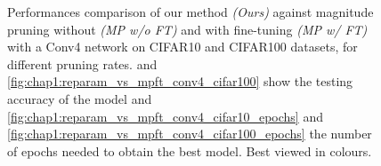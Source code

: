 \begin{figure}
  \caption{ Performances comparison of our method {\em(Ours)} against
  magnitude pruning without {\em(MP w/o FT)} and with fine-tuning {\em(MP w/ FT)} with a Conv4 network on
  CIFAR10 and CIFAR100 datasets, for different pruning rates.
   and
  \cref{fig:chap1:reparam_vs_mpft_conv4_cifar100} show the testing accuracy of
  the model and \cref{fig:chap1:reparam_vs_mpft_conv4_cifar10_epochs} and
  \cref{fig:chap1:reparam_vs_mpft_conv4_cifar100_epochs} the number of epochs
  needed to obtain the best model. Best viewed in colours.}
  \label{fig:chap1:reparam_vs_mpft_conv4}
\end{figure}

\begin{figure}
  \centering
  \\

\end{figure}
